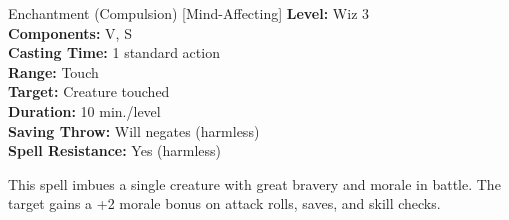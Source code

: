 {Enchantment (Compulsion) [Mind-Affecting]}
{
	\textbf{Level:}
	Wiz 3\\
	\textbf{Components:}
	V, S\\
	\textbf{Casting Time:}
	1 standard action\\
	\textbf{Range:}
	Touch\\
	\textbf{Target:}
	Creature touched\\
	\textbf{Duration:}
	10 min./level\\
	\textbf{Saving Throw:}
	Will negates (harmless)\\
	\textbf{Spell Resistance:}
	Yes (harmless)\\
}
{
	This spell imbues a single creature with great bravery and morale in battle. The target gains a +2 morale bonus on attack rolls, saves, and skill checks.

}
